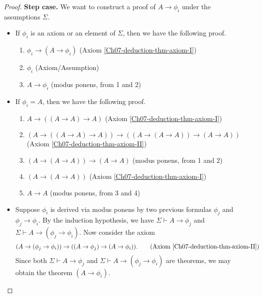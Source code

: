 \begin{proof}
    \textbf{Step case.} We want to construct a proof of \(A \rightarrow \phi_i\) under the assumptions \(\Sigma\).
    \begin{itemize}
        \item If \(\phi_i\) is an axiom or an element of \(\Sigma\), then we have the following proof.
        \begin{enumerate}
            \item \(\phi_i \rightarrow (A \rightarrow \phi_i)\)
            \hfill (Axiom \ref{Ch07-deduction-thm-axiom-I})

            \item \(\phi_i\)
            \hfill (Axiom/Assumption)

            \item \(A \rightarrow \phi_i\)
            \hfill (modus ponens, from 1 and 2)
        \end{enumerate}

        \item If \(\phi_i = A\), then we have the following proof.
        \begin{enumerate}
            \item \(A \rightarrow ((A\rightarrow A) \rightarrow A)\)
            \hfill(Axiom \ref{Ch07-deduction-thm-axiom-I})

            \item \((A \rightarrow ((A\rightarrow A) \rightarrow A)) \rightarrow ((A\rightarrow(A\rightarrow A))\rightarrow(A\rightarrow A))\)
            \hfill(Axiom \ref{Ch07-deduction-thm-axiom-II})

            \item \((A\rightarrow(A\rightarrow A))\rightarrow(A\rightarrow A)\)
            \hfill(modus ponens, from 1 and 2)

            \item \((A\rightarrow(A\rightarrow A))\)
            \hfill(Axiom \ref{Ch07-deduction-thm-axiom-I})

            \item \(A\rightarrow A\)
            \hfill(modus ponens, from 3 and 4)
        \end{enumerate}

        \item Suppose \(\phi_i\) is derived via modus ponens by two previous formulas \(\phi_j\) and \(\phi_j \rightarrow \phi_i\). By the induction hypothesis, we have \(\Sigma\vdash A\rightarrow\phi_j\) and \(\Sigma\vdash A\rightarrow(\phi_j \rightarrow\phi_i)\). Now consider the axiom 
        \[
            (A\rightarrow(\phi_j\rightarrow\phi_i)) \rightarrow ((A\rightarrow\phi_j)\rightarrow(A\rightarrow\phi_i))\text{.}
            \tag{Axiom \ref{Ch07-deduction-thm-axiom-II}}
        \]
        Since both \(\Sigma\vdash A\rightarrow\phi_j\) and \(\Sigma\vdash A\rightarrow(\phi_j \rightarrow\phi_i)\) are theorems, we may obtain the theorem \((A\rightarrow\phi_i)\).
    \end{itemize}


\end{proof}
